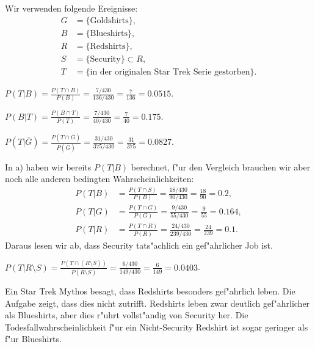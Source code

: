 \begin{loesung}
Wir verwenden folgende Ereignisse:
\begin{align*}
G&=\{\text{Goldshirts}\},\\
B&=\{\text{Blueshirts}\},\\
R&=\{\text{Redshirts}\},\\
S&=\{\text{Security}\}\subset R,\\
T&=\{\text{in der originalen Star Trek Serie gestorben}\}.
\end{align*}
\begin{teilaufgaben}
\item
$
\displaystyle
P(T|B)
=
\frac{P(T\cap B)}{P(B)}
=
\frac{7/430}{136/430}
=
\frac{7}{136}
=0.0515.
$
\item
$
\displaystyle
P(B|T)
=
\frac{P(B\cap T)}{P(T)}
=
\frac{7/430}{40/430}
=
\frac{7}{40}
=0.175.
$
\item
$
\displaystyle
P(T|\bar G)
=
\frac{P(T\cap\bar G)}{P(\bar G)}
=
\frac{31/430}{375/430}
=
\frac{31}{375}
=0.0827.
$
\item
In a) haben wir bereits $P(T|B)$ berechnet, f"ur den Vergleich
brauchen wir aber noch alle anderen bedingten Wahrscheinlichkeiten:
\begin{align*}
P(T|B)&
=\frac{P(T\cap S)}{P(B)}
=\frac{18/430}{90/430}
=\frac{18}{90}
=0.2,
\\
P(T|G)&
=\frac{P(T\cap G)}{P(G)}
=\frac{9/430}{55/430}
=\frac{9}{55}
=0.164,
\\
P(T|R)&
=\frac{P(T\cap R)}{P(R)}
=\frac{24/430}{239/430}
=\frac{24}{239}
=0.1.
\end{align*}
Daraus lesen wir ab, dass Security tats"achlich ein gef"ahrlicher
Job ist.
\item
$
\displaystyle
P(T|R\setminus S)
=\frac{P(T\cap(R\setminus S))}{P(R\setminus S)}
=\frac{6/430}{149/430}
=\frac{6}{149}
=0.0403$.
\end{teilaufgaben}
\end{loesung}

\begin{diskussion}
Ein Star Trek Mythos besagt, dass Redshirts besonders gef"ahrlich
leben. Die Aufgabe zeigt, dass dies nicht zutrifft.
Redshirts leben zwar deutlich gef"ahrlicher als Blueshirts, aber
dies r"uhrt vollst"andig von Security her. Die Todesfallwahrscheinlichkeit
f"ur ein Nicht-Security Redshirt ist sogar geringer als f"ur Blueshirts.
\end{diskussion}


